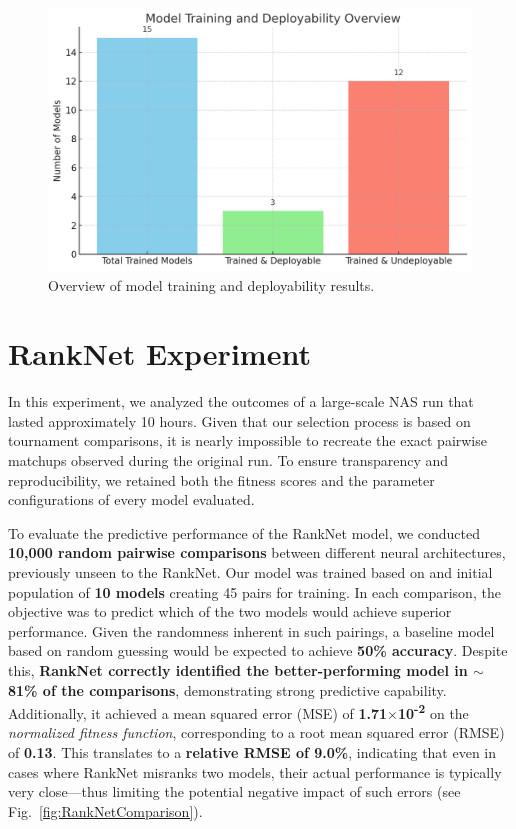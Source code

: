 \bigskip

\begin{figure}[ht]
    \centering
    \includegraphics[width=0.85\linewidth]{Pictures/MemoryEstimationTest.png}
    \caption{Overview of model training and deployability results.}
    \label{fig:memoryEstimationTest}
\end{figure}





\section{RankNet Experiment}
\label{sec:ranknet_experiment}
In this experiment, we analyzed the outcomes of a large-scale NAS run that lasted approximately 10 hours. Given that our selection process is based on tournament comparisons, it is nearly impossible to recreate the exact pairwise matchups observed during the original run. To ensure transparency and reproducibility, we retained both the fitness scores and the parameter configurations of every model evaluated.

To evaluate the predictive performance of the RankNet model, we conducted \textbf{10{,}000 random pairwise comparisons} between different neural architectures, previously unseen to the RankNet. Our model was trained based on and initial population of \textbf{10 models} creating 45 pairs for training. In each comparison, the objective was to predict which of the two models would achieve superior performance. Given the randomness inherent in such pairings, a baseline model based on random guessing would be expected to achieve \textbf{50\% accuracy}. Despite this, \textbf{RankNet correctly identified the better-performing model in $\sim$81\% of the comparisons}, demonstrating strong predictive capability. Additionally, it achieved a mean squared error (MSE) of \textbf{1.71$\times$10\textsuperscript{-2}} on the \textit{normalized fitness function}, corresponding to a root mean squared error (RMSE) of \textbf{0.13}. This translates to a \textbf{relative RMSE of 9.0\%}, indicating that even in cases where RankNet misranks two models, their actual performance is typically very close—thus limiting the potential negative impact of such errors (see Fig.~\ref{fig:RankNetComparison}).


